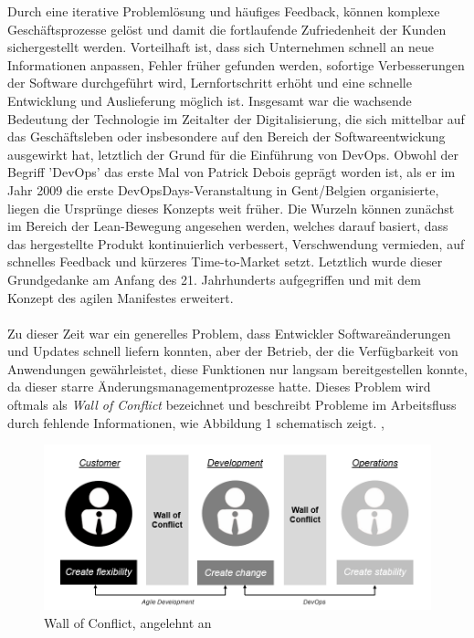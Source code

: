 \cite[S. 18]{ravichandran_devops_2016} Durch eine iterative Problemlösung und häufiges Feedback, können komplexe Geschäftsprozesse gelöst und damit die fortlaufende Zufriedenheit der Kunden sichergestellt werden. Vorteilhaft ist, dass sich Unternehmen schnell an neue Informationen anpassen, Fehler früher gefunden werden, sofortige Verbesserungen der Software durchgeführt wird, Lernfortschritt erhöht und eine schnelle Entwicklung und Auslieferung möglich ist. \cite[S. 18]{ravichandran_devops_2016} Insgesamt war die wachsende Bedeutung der Technologie im Zeitalter der Digitalisierung, die sich mittelbar auf das Geschäftsleben oder insbesondere auf den Bereich der Softwareentwickung ausgewirkt hat, letztlich der Grund für die Einführung von DevOps. \cite{haffke_transformative_2017} Obwohl der Begriff 'DevOps' das erste Mal von Patrick Debois geprägt worden ist, als er im Jahr 2009 die erste DevOpsDays-Veranstaltung in Gent/Belgien organisierte, liegen die Ursprünge dieses Konzepts weit früher. \cite[S.3]{kim_devops-handbuch_2017} Die Wurzeln können zunächst im Bereich der Lean-Bewegung angesehen werden, welches darauf basiert, dass das hergestellte Produkt kontinuierlich verbessert, Verschwendung vermieden, auf schnelles Feedback und kürzeres Time-to-Market setzt. \cite[S.2]{kim_devops-handbuch_2017} \cite{nelson_devops_2016} \cite[S. 11]{ravichandran_devops_2016} Letztlich wurde dieser Grundgedanke am Anfang des 21. Jahrhunderts aufgegriffen und mit dem Konzept des agilen Manifestes \cite{beck_manifesto_2001} erweitert.\\\\ Zu dieser Zeit war ein generelles Problem, dass Entwickler Softwareänderungen und Updates schnell liefern konnten, aber der Betrieb, der die Verfügbarkeit von Anwendungen gewährleistet, diese Funktionen nur langsam bereitgestellen konnte, da dieser starre Änderungsmanagementprozesse hatte. Dieses Problem wird oftmals als \textit{Wall of Conflict} bezeichnet und beschreibt Probleme im Arbeitsfluss durch fehlende Informationen, wie Abbildung 1 schematisch zeigt. \cite{kawaguchi_wall_2020}, \cite[S. 26]{huttermann_devops_2012} 

\begin{figure}[h]
    \centering
    \includegraphics[scale=0.6]{Bilder/Wall of Conflict.png}
    \caption{Wall of Conflict, angelehnt an \cite{hering_devops_2018}}
\end{figure}

